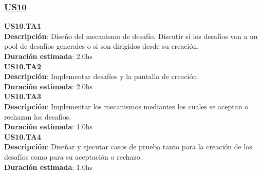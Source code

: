 \begin{tcolorbox}
\subsubsection*{\underline{US10}}
\textbf{US10.TA1} \\
\textbf{Descripción}: Diseño del mecanismo de desafío. Discutir si los desafíos van a un pool de desafíos generales o si son dirigidos desde su creación.\\
\textbf{Duración estimada}: 2.0hs \\
\newline
\textbf{US10.TA2} \\
\textbf{Descripción}: Implementar desafíos y la pantalla de creación.\\
\textbf{Duración estimada}: 2.0hs \\
\newline
\textbf{US10.TA3} \\
\textbf{Descripción}: Implementar los mecanismos mediantes los cuales se aceptan o rechazan los desafíos.\\
\textbf{Duración estimada}: 1.0hs \\
\newline
\textbf{US10.TA4} \\
\textbf{Descripción}: Diseñar y ejecutar casos de prueba tanto para la creación de los desafíos como para su aceptación o rechazo.\\
\textbf{Duración estimada}: 1.0hs
\end{tcolorbox}
\vspace{10pt}




